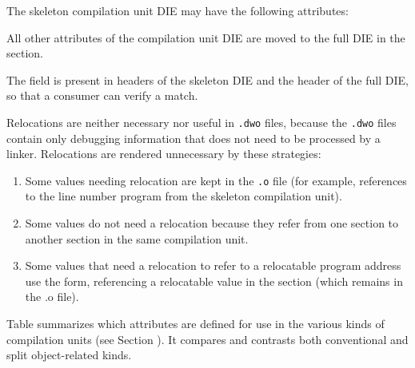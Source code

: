 The skeleton 
\bb
compilation unit 
\eb
DIE may have the following attributes:

All other attributes of the compilation unit DIE are moved to
the full DIE in the \dotdebuginfodwo{} section.

The \HFNdwoid{} field is present in headers of the skeleton DIE 
and the header of the full DIE, so that a consumer
can verify a match.

Relocations are neither necessary nor useful in 
\texttt{.dwo} files, because the \texttt{.dwo}  
files contain only debugging information that does not need to be
processed by a linker. Relocations are rendered unnecessary by 
\bb
these
\eb
strategies:

\begin{enumerate}[1. ]
\item Some values needing relocation are kept in the \texttt{.o} file
(for example, references to the line number program from the skeleton
compilation unit).

\item Some values do not need a relocation because they refer from
one \dotdwo{} section to another \dotdwo{} section
in the same compilation unit. 

\item Some values that need a relocation to refer to a relocatable 
program address use the \DWFORMaddrx{} form, referencing a relocatable 
value in the \dotdebugaddr{} section (which remains in the .o file).

\bbpareb
\end{enumerate}


Table  summarizes which
attributes are defined for use in the various 
kinds of compilation units (see Section ). 
It compares and contrasts both conventional and split object-related
kinds.

